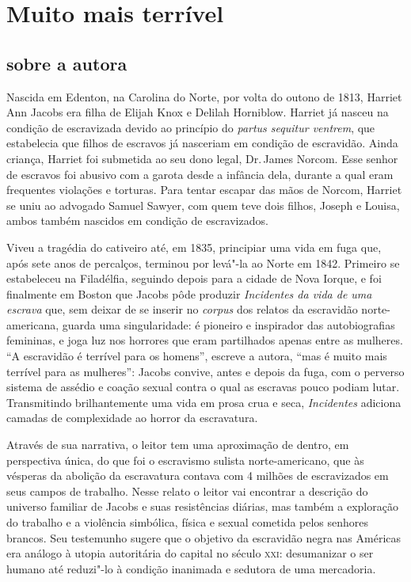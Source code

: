 \chapter[Muito mais terrível: a vida de Harriet Jacobs]{Muito mais terrível }

\section{sobre a autora}

\noindent{}Nascida em Edenton, na Carolina do Norte, por volta do outono de 1813, Harriet Ann Jacobs era filha de Elijah Knox e Delilah Horniblow. Harriet já nasceu na
condição de escravizada devido ao princípio do \textit{partus sequitur ventrem},
que estabelecia que filhos de escravos já nasceriam em condição de
escravidão. Ainda criança, Harriet foi submetida ao seu dono legal, Dr.\,James Norcom.
Esse senhor de escravos foi abusivo com a garota desde a
infância dela, durante a qual eram frequentes violações e torturas. Para
tentar escapar das mãos de Norcom, Harriet se uniu ao advogado Samuel
Sawyer, com quem teve dois filhos, Joseph e Louisa, ambos também
nascidos em condição de escravizados.


Viveu a tragédia do cativeiro até, em 1835, principiar uma vida em fuga que, após sete anos de percalços, terminou por levá"-la ao Norte em 1842. Primeiro se estabeleceu na Filadélfia, seguindo depois para a cidade de Nova Iorque, e foi finalmente em Boston que Jacobs pôde produzir \textit{Incidentes da vida de uma escrava} que, sem deixar de se inserir no \textit{corpus} dos relatos da escravidão norte-americana, guarda uma singularidade: é pioneiro e inspirador das autobiografias femininas, e joga luz nos horrores que eram partilhados apenas entre as mulheres. “A escravidão é terrível para os homens”, escreve a autora, “mas é muito mais terrível para as mulheres”: Jacobs convive, antes e depois da fuga, com o perverso sistema de assédio e coação sexual contra o qual as escravas pouco podiam lutar. Transmitindo brilhantemente uma vida em prosa crua e seca, \textit{Incidentes} adiciona camadas de complexidade ao horror da escravatura.

Através de sua narrativa, o leitor tem uma aproximação de dentro, em perspectiva única, do que foi o escravismo sulista norte-americano, que às vésperas da abolição da escravatura contava com 4 milhões de escravizados em seus campos de trabalho. Nesse relato o leitor vai encontrar a descrição do universo familiar de Jacobs e suas resistências diárias, mas também a exploração do trabalho e a violência simbólica, física e sexual cometida pelos senhores brancos. Seu testemunho sugere que o objetivo da escravidão negra nas Américas era análogo à utopia autoritária do capital no século \textsc{xxi}: desumanizar o ser humano até reduzi"-lo à condição inanimada e sedutora de uma mercadoria.

